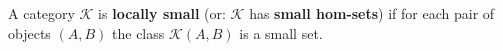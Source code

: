 A category $\mathcal{K}$ is \textbf{locally small} (or: $\mathcal{K}$ has \textbf{small hom-sets}) if for each pair of objects $(A, B)$ the class $\mathcal{K}(A, B)$ is a small set.
